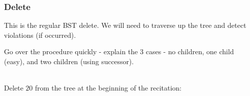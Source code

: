 \subsubsection{Delete}
This is the regular BST delete. We will need to traverse up the
tree and detect violations (if occurred).\\
\begin{remark} Go over the procedure quickly - explain the 3 cases - no
children, one child (easy), and two children (using successor).
\end{remark}
\begin{example}\\
    Delete $20$ from the tree at the beginning of the recitation:\\
\end{example}
%
%
%
